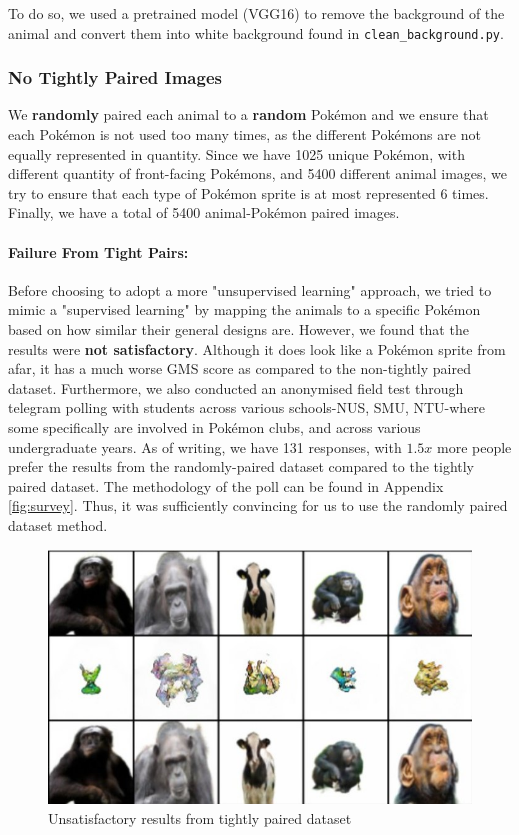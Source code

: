 \documentclass[twoside,english,notitlepage]{report}
\begin{document}
\noindent To do so, we used a pretrained model (VGG16) to remove the background of the animal and convert them into white background found in \verb|clean_background.py|.

\subsubsection{No Tightly Paired Images}
We \textbf{randomly} paired each animal to a \textbf{random} Pokémon and we ensure that each Pokémon is not used too many times, as the different Pokémons are not equally represented in quantity. Since we have 1025 unique Pokémon, with different quantity of front-facing Pokémons, and 5400 different animal images, we try to ensure that each type of Pokémon sprite is at most represented 6 times. Finally, we have a total of 5400 animal-Pokémon paired images. 

\paragraph{Failure From Tight Pairs:} Before choosing to adopt a more "unsupervised learning" approach, we tried to mimic a "supervised learning" by mapping the animals to a specific Pokémon based on how similar their general designs are. However, we found that the results were \textbf{not satisfactory}. Although it does look like a Pokémon sprite from afar, it has a much worse GMS score as compared to the non-tightly paired dataset. Furthermore, we also conducted an anonymised field test through telegram polling with students across various schools-NUS, SMU, NTU-where some specifically are involved in Pokémon clubs, and across various undergraduate years. As of writing, we have 131 responses, with $1.5x$ more people prefer the results from the randomly-paired dataset compared to the tightly paired dataset. The methodology of the poll can be found in Appendix \ref{fig:survey}. Thus, it was sufficiently convincing for us to use the randomly paired dataset method.

\begin{figure}[h]
    \centering
    \includegraphics[width=\textwidth]{task2/poke-fail2.jpg}
    \vspace{-10pt}
    \caption{Unsatisfactory results from tightly paired dataset}
\end{figure}
\end{document}
